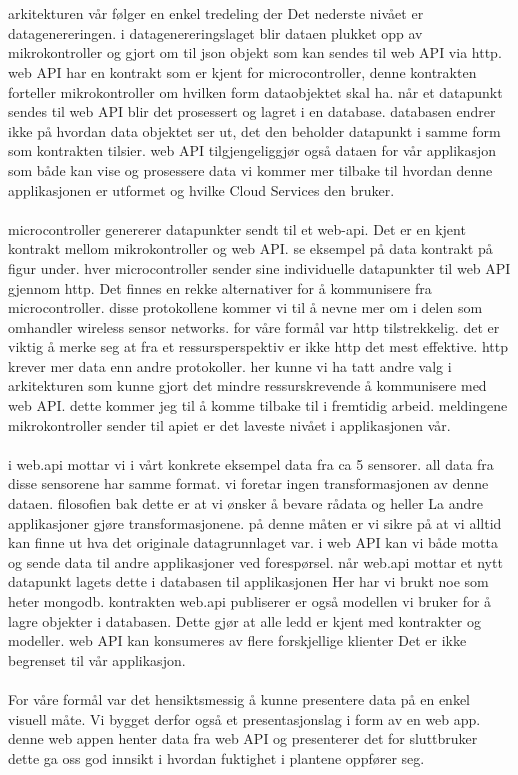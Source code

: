 \documentclass[]{uiophd}
\begin{document}
\\\\
 arkitekturen vår følger en enkel tredeling der Det nederste nivået er datagenereringen.  i datagenereringslaget  blir dataen plukket opp av mikrokontroller og gjort om til json  objekt som kan sendes til web API via http.  web API har en kontrakt som er kjent for microcontroller,  denne kontrakten forteller mikrokontroller om hvilken form dataobjektet  skal ha.  når et datapunkt sendes til web API blir det prosessert  og lagret i en database.  databasen endrer ikke på hvordan data objektet ser ut,   det den beholder datapunkt  i samme  form som kontrakten tilsier.   web API tilgjengeliggjør også dataen for vår applikasjon som både kan vise og prosessere data vi kommer mer tilbake til hvordan denne applikasjonen er utformet og hvilke Cloud Services den bruker.
\\\\
microcontroller genererer datapunkter sendt til et web-api. Det er en kjent kontrakt mellom mikrokontroller og web API.  se eksempel på data kontrakt på figur under.  hver microcontroller  sender sine individuelle datapunkter til web API gjennom http. Det finnes en rekke alternativer for å kommunisere fra  microcontroller. disse protokollene kommer vi til å nevne mer om i delen som omhandler wireless sensor networks. for våre formål  var http tilstrekkelig.  det er viktig å merke seg at fra et ressursperspektiv er ikke http det mest effektive. http krever mer data enn andre protokoller. her kunne vi ha tatt andre valg i arkitekturen som kunne gjort det  mindre ressurskrevende å kommunisere med web API.  dette kommer jeg til å komme tilbake til i fremtidig arbeid.  meldingene mikrokontroller sender til apiet  er det laveste nivået i applikasjonen vår.
\\\\
 i web.api mottar vi i vårt konkrete eksempel data fra ca 5 sensorer. all data fra disse sensorene har samme format.  vi foretar ingen transformasjonen av denne dataen. filosofien bak dette er at vi ønsker å bevare rådata og heller La andre applikasjoner gjøre transformasjonene.  på denne måten er vi sikre på at vi alltid kan finne ut hva det originale datagrunnlaget var.  i web API  kan vi både motta og sende data til andre applikasjoner ved forespørsel. når web.api mottar et nytt datapunkt lagets dette i databasen til applikasjonen Her har vi brukt noe som heter mongodb. kontrakten web.api publiserer er også modellen vi bruker for å lagre objekter i databasen. Dette gjør at alle ledd er kjent med kontrakter og modeller.   web API kan konsumeres av flere forskjellige klienter Det er ikke begrenset til vår applikasjon. 
\\\\
For våre formål var det hensiktsmessig å kunne presentere data på en enkel visuell måte. Vi bygget derfor også et presentasjonslag  i form av en web app.  denne web appen henter data fra  web API og presenterer det for sluttbruker dette ga oss god innsikt i hvordan fuktighet i plantene oppfører seg.
\end{document}
